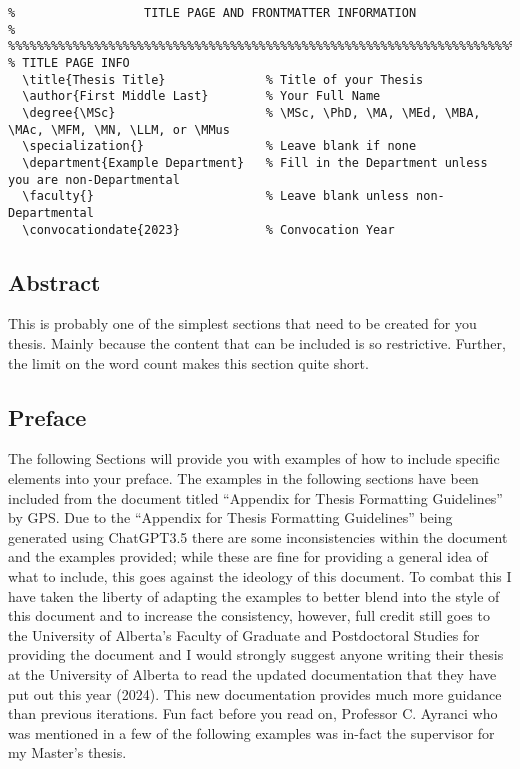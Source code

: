 			\begin{lstlisting}[float=ht,caption=Example of How to Set Title Page Info,label=lst:TitlePage,style=LaTeXStyle,basicstyle=\scriptsize\ttfamily,]
%%%%%%%%%%%%%%%%%%%%%%%%%%%%%%%%%%%%%%%%%%%%%%%%%%%%%%%%%%%%%%%%%%%%%%%%%%%%%%%%
%                  TITLE PAGE AND FRONTMATTER INFORMATION                      %
%%%%%%%%%%%%%%%%%%%%%%%%%%%%%%%%%%%%%%%%%%%%%%%%%%%%%%%%%%%%%%%%%%%%%%%%%%%%%%%%
% TITLE PAGE INFO
  \title{Thesis Title}              % Title of your Thesis
  \author{First Middle Last}        % Your Full Name
  \degree{\MSc}                     % \MSc, \PhD, \MA, \MEd, \MBA, \MAc, \MFM, \MN, \LLM, or \MMus
  \specialization{}                 % Leave blank if none
  \department{Example Department}   % Fill in the Department unless you are non-Departmental
  \faculty{}                        % Leave blank unless non-Departmental
  \convocationdate{2023}            % Convocation Year
			\end{lstlisting}
	
		\subsection{Abstract}\label{abstract}
			This is probably one of the simplest sections that need to be created for you thesis.
			Mainly because the content that can be included is so restrictive.
			Further, the limit on the word count makes this section quite short.
			

		\subsection{Preface}\label{preface}
			The following Sections will provide you with examples of how to include specific elements into your preface.
			The examples in the following sections have been included from the document titled ``Appendix for Thesis Formatting Guidelines'' by GPS\cite{FGPS2024}.
			Due to the ``Appendix for Thesis Formatting Guidelines'' being generated using ChatGPT3.5 there are some inconsistencies within the document and the examples provided; while these are fine for providing a general idea of what to include, this goes against the ideology of this document.
			To combat this I have taken the liberty of adapting the examples to better blend into the style of this document and to increase the consistency, however, full credit still goes to the University of Alberta's Faculty of Graduate and Postdoctoral Studies for providing the document and I would strongly suggest anyone writing their thesis at the University of Alberta to read the updated documentation that they have put out this year (2024).
			This new documentation provides much more guidance than previous iterations.
			Fun fact before you read on, Professor C. Ayranci who was mentioned in a few of the following examples was in-fact the supervisor for my Master's thesis.
			
